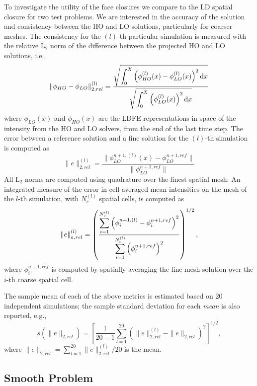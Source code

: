 To investigate the utility of the face closures we compare to the LD spatial
closure for two test problems.  We are interested in the accuracy of the solution and
consistency between the HO and LO solutions, particularly for coarser meshes. 
The consistency for the $(l)$-th particular simulation is measured with the relative L$_2$ norm
of the difference between the projected HO and LO solutions, i.e.,
\begin{equation}
    \|\phi_{HO} - \phi_{LO}\|^{(l)}_{2,rel} = \frac{\displaystyle \sqrt{\int_0^X \left(
        \phi_{HO}^{(l)}(x) - \phi_{LO}^{(l)}(x) \right)^2 \mathrm{d} x}}{\displaystyle \sqrt{
            \int_0^X \left(\phi_{LO}^{(l)}(x)\right)^2 \mathrm{d} x }}
\end{equation}
where $\phi_{LO}(x)$ and $\phi_{HO}(x)$ are the LDFE representations in space of the
intensity from the HO and LO solvers, from the end of the last time step.
The error between a reference solution and a fine solution for the ${(l)}$-th simulation
is computed as
\begin{equation}
    \|e\|^{{(l)}}_{2,rel} = \frac{\|\phi_{LO}^{n+1,{(l)}}(x) -
    \phi_{LO}^{n+1,ref}\|}{\|\phi_{LO}^{n+1,ref}\|}
\end{equation}
All L$_2$ norms are computed using quadrature over the finest spatial mesh.  An
integrated measure of the error in cell-averaged mean intensities on the mesh of the
$l$-th simulation, with $N_c^{(l)}$ spatial cells, is computed as
\begin{equation}
    \|e\|^{{(l)}}_{a,rel} = \left({\frac{\displaystyle \sum\limits_{i=1}^{N^{(l)}_c}
    \left(\phi_i^{n+1,{(l)}} - \phi_i^{n+1,ref}
\right)^2}{\displaystyle \sum\limits_{i=1}^{N^{(l)}_c}\left(\phi_i^{n+1,ref}\right)^2}}\right)^{1/2},
\end{equation}
where $\phi_i^{n+1,ref}$ is computed by spatially averaging the fine mesh solution over
the $i$-th coarse spatial cell.

The sample mean of each of the above metrics is estimated based on 20 independent
simulations; the sample standard deviation for each \emph{mean} is also reported, e.g.,
\begin{equation}
    s\left(\|e\|_{2,rel}\right) = \left[\frac{1}{20-1}\sum_{l=1}^{20} \left(
    \|e\|_{2,rel}^{(l)} - \|e\|_{2,rel} \right)^2\right]^{1/2},
\end{equation}
where $\|e\|_{2,rel}=\sum_{l=1}^{20}\|e\|_{2,rel}^{(l)}/20$ is the mean.

\subsection{Smooth Problem}

